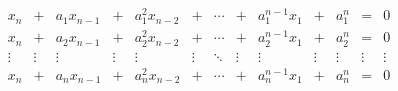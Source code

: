 \documentclass[class=nhvh-linear-algebra,crop=false]{standalone}
\begin{document}
\begin{exercise}
	\[
		\begin{array}{ccccccccccccc}
			x_{n}  & +      & a_{1}x_{n-1} & +      & a_{1}^{2}x_{n-2} & +      & \cdots & +      & a_{1}^{n-1}x_{1} & +      & a_{1}^{n} & =      & 0      \\
			x_{n}  & +      & a_{2}x_{n-1} & +      & a_{2}^{2}x_{n-2} & +      & \cdots & +      & a_{2}^{n-1}x_{1} & +      & a_{2}^{n} & =      & 0      \\
			\vdots & \vdots & \vdots       & \vdots & \vdots           & \vdots & \ddots & \vdots & \vdots           & \vdots & \vdots    & \vdots & \vdots \\
			x_{n}  & +      & a_{n}x_{n-1} & +      & a_{n}^{2}x_{n-2} & +      & \cdots & +      & a_{n}^{n-1}x_{1} & +      & a_{n}^{n} & =      & 0      \\
		\end{array}
	\]
\end{exercise}
\end{document}
